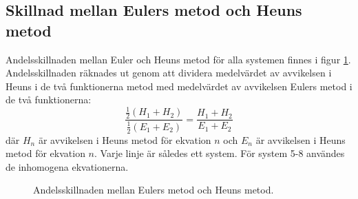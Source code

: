 \clearpage

\subsection{Skillnad mellan Eulers metod och Heuns metod}
Andelsskillnaden mellan Euler och Heuns metod för alla systemen finnes i figur \ref{fig:diff_euler_heun}. Andelsskillnaden räknades ut genom att dividera medelvärdet av avvikelsen i Heuns i de två funktionerna metod med medelvärdet av avvikelsen Eulers metod i de två funktionerna:
\begin{equation}
    \frac{\frac{1}{2}(H_1+H_2)}{\frac{1}{2}(E_1+E_2)}=\frac{H_1+H_2}{E_1+E_2}
\end{equation} där \(H_n\) är avvikelsen i Heuns metod för ekvation \(n\) och \(E_n\) är avvikelsen i Heuns metod för ekvation \(n\). Varje linje är således ett system. För system 5-8 användes de inhomogena ekvationerna.

\begin{figure}[h!]
    \centering
    
    \caption{Andelsskillnaden mellan Eulers metod och Heuns metod.}
    \label{fig:diff_euler_heun}
\end{figure}

